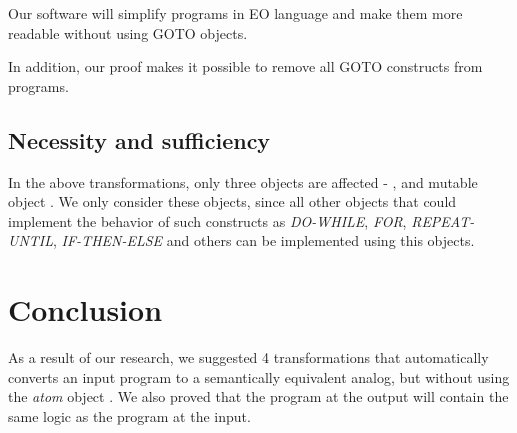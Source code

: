 \documentclass[sigplan,review,11pt,nonacm,natbib=false]{acmart}
\theoremstyle{theorems}
\begin{document}
    Our software will simplify programs in EO language and make them more readable without using GOTO objects.

    In addition, our proof makes it possible to remove all GOTO constructs from programs.

    \subsection{Necessity and sufficiency}
    In the above transformations, only three objects are affected - ,  and mutable object .
    We only consider these objects, since all other objects that could implement the behavior of such constructs as \emph{DO-WHILE}, \emph{FOR}, \emph{REPEAT-UNTIL}, \emph{IF-THEN-ELSE} and others can be implemented using this objects.

    \section{Conclusion}

    As a result of our research, we suggested 4 transformations that automatically converts an input program to a semantically equivalent analog, but without using the \emph{atom} object .
    We also proved that the program at the output will contain the same logic as the program at the input.


    \printbibliography %
\end{document}

